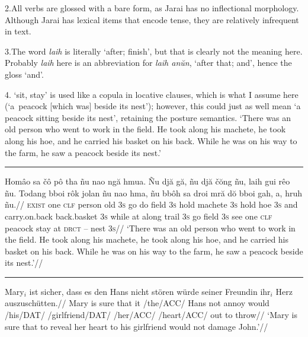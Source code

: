\documentclass[12pt]{article}
\begin{document}
2.\enspace All verbs are glossed with a bare form, as Jarai has
no inflectional morphology. Although Jarai has lexical items that
encode tense, they are relatively infrequent in text.

3.\enspace The word {\it laih} is literally `after; finish', but
that is clearly not the meaning here. Probably {\it laih} here is
an abbreviation for {\it laih an\u{u}n}, `after that; and', hence
the gloss `and'.

4. `sit, stay' is used like a copula in
locative clauses, which is what I assume here (`a~peacock
[which was] beside its nest'); however, this could just as well
mean `a peacock sitting beside its nest', retaining the posture
semantics.
\endpanel
\bigskip
`There was an old person who went to work in the field. He took
along his machete, he took along his hoe, and he carried his
basket on his back. While he was on his way to the farm, he saw a
peacock beside its nest.'
\xe
\endgroup
\bigskip

\filbreak\hrule\medskip

\begingroup
\ex[glhangstyle=cascade]
\let\\=\textsc
\begingl
\gla
Hom\^{a}o sa \v{c}\^{o} p\^{o} tha  \~{n}u nao ng\u{a} hmua. \~{N}u
dj\u{a} g\u{a}, \~{n}u dj\u{a} \v{c}\u{o}ng \~{n}u, laih gui r\^{e}o
\~{n}u. Todang bboi r\^{o}k jolan \~{n}u nao hma, \~{n}u bb\^{o}h sa
droi mr\u{a} d\u{o} bboi gah, a, hruh \~{n}u.//
\glb
\\{exist} one \\{clf} person old \\{3s} go do field \\{3s} hold
machete \\{3s} hold hoe \\{3s} and carry.on.back back.basket \\{3s}
while at along trail \\{3s} go field \\{3s} see one \\{clf} peacock
stay at \\{drct} -- nest \\{3s}//
\glft
`There was an old person who went to work in the field. He took
along his machete, he took along his hoe, and he carried his
basket on his back. While he was on his way to the farm, he saw a
peacock beside its nest.'//
\endgl
\xe
\endgroup
\bigskip

\filbreak\hrule\medskip

\begingroup
\ex[glufcloseup=.4ex,everygluf=\footnotesize]
\begingl
\gla Mary$_i$ ist sicher, dass es den Hans nicht st\"oren
   w\"urde seiner Freundin ihr$_i$ Herz auszusch\"utten.//
\glb Mary is sure that it \gluf/the/ACC/ Hans not annoy would
   \gluf/his/DAT/ \gluf/girlfriend/DAT/ \gluf/her/ACC/
   \gluf/heart/ACC/ {out to throw}//
\glft `Mary is sure that to reveal her heart to his girlfriend
would not damage John.'//
\endgl
\xe
\endgroup
\bigskip
\end{document}
